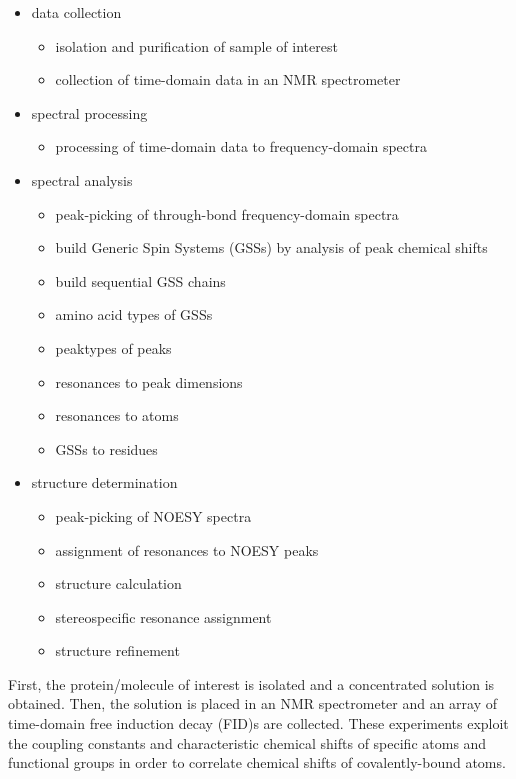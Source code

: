 \begin{itemize}
  \item data collection
  \begin{itemize}
     \item isolation and purification of sample of interest
     \item collection of time-domain data in an NMR spectrometer
  \end{itemize}
  \item spectral processing
  \begin{itemize}
     \item processing of time-domain data to frequency-domain spectra
  \end{itemize}
  \item spectral analysis
  \begin{itemize}
     \item peak-picking of through-bond frequency-domain spectra
     \item build Generic Spin Systems \cite{autoassign1997} (GSSs) by 
       analysis of peak chemical shifts
     \item build sequential GSS chains
     \item amino acid types of GSSs
     \item peaktypes of peaks
     \item resonances to peak dimensions
     \item resonances to atoms
     \item GSSs to residues
  \end{itemize}
  \item structure determination
  \begin{itemize}
    \item peak-picking of NOESY spectra
    \item assignment of resonances to NOESY peaks
    \item structure calculation
    \item stereospecific resonance assignment
    \item structure refinement
  \end{itemize}
\end{itemize}

First, the protein/molecule of interest is isolated and a concentrated solution 
is obtained.  Then, the solution is placed in an NMR spectrometer and an array 
of time-domain free induction decay (FID)s are collected.  These experiments 
exploit the coupling constants and characteristic chemical shifts of specific 
atoms and functional groups in order to correlate chemical shifts of 
covalently-bound atoms.

